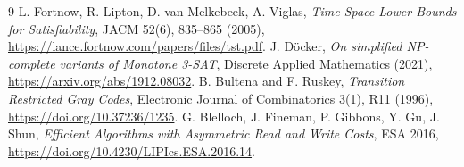 \documentclass[11pt]{article}
\begin{document}
\begin{thebibliography}{9}
 L. Fortnow, R. Lipton, D. van Melkebeek, A. Viglas,
\emph{Time-Space Lower Bounds for Satisfiability}, JACM 52(6), 835--865 (2005),
\url{https://lance.fortnow.com/papers/files/tst.pdf}.
 J. D\"ocker, \emph{On simplified NP-complete variants of Monotone
3-SAT}, Discrete Applied Mathematics (2021),
\url{https://arxiv.org/abs/1912.08032}.
 B. Bultena and F. Ruskey, \emph{Transition Restricted Gray Codes},
Electronic Journal of Combinatorics 3(1), R11 (1996),
\url{https://doi.org/10.37236/1235}.
 G. Blelloch, J. Fineman, P. Gibbons, Y. Gu, J. Shun,
\emph{Efficient Algorithms with Asymmetric Read and Write Costs}, ESA 2016,
\url{https://doi.org/10.4230/LIPIcs.ESA.2016.14}.
\end{thebibliography}
\end{document}
